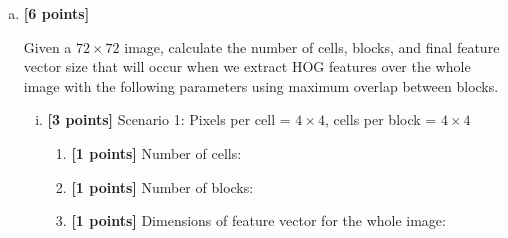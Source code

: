 \begin{enumerate}[(a)]
\item \textbf{[6 points]}
\begin{tcolorbox}[colback=orange!5!white,colframe=orange!75!black]
     Given a $72\times72$ image, calculate the number of cells, blocks, and final feature vector size that will occur when we extract HOG features over the whole image with the following parameters using maximum overlap between blocks.
\end{tcolorbox}

\begin{enumerate}[(i)]
    \item \textbf{[3 points]} Scenario 1: Pixels per cell = $4\times4$, cells per block = $4\times4$ %

\begin{enumerate}[1.]
    \item \textbf{[1 points]} Number of cells: 

    \item \textbf{[1 points]} Number of blocks: 

    \item \textbf{[1 points]} Dimensions of feature vector for the whole image: 
\end{enumerate}
\end{enumerate}
\end{enumerate}
